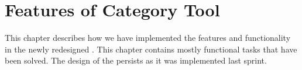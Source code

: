 
\chapter{Features of Category Tool}

This chapter describes how we have implemented the features and functionality in the newly redesigned \ct. This chapter contains mostly functional tasks that have been solved. The design of the \ct persists as it was implemented last sprint.
















